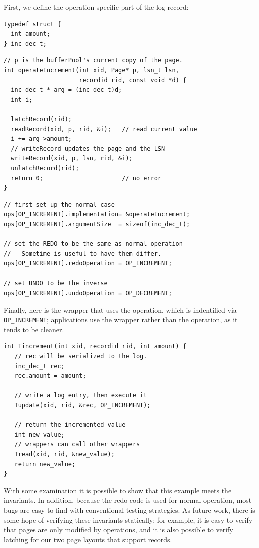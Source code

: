 \documentclass[letterpaper,twocolumn,english]{article}
\begin{document}
First, we define the operation-specific part of the log record:
\begin{small}
\begin{verbatim}
typedef struct {
  int amount;
} inc_dec_t;
\end{verbatim}
\begin{verbatim}
// p is the bufferPool's current copy of the page.
int operateIncrement(int xid, Page* p, lsn_t lsn,
                     recordid rid, const void *d) {
  inc_dec_t * arg = (inc_dec_t)d;
  int i;

  latchRecord(rid); 
  readRecord(xid, p, rid, &i);   // read current value
  i += arg->amount;
  // writeRecord updates the page and the LSN
  writeRecord(xid, p, lsn, rid, &i);
  unlatchRecord(rid); 
  return 0;                      // no error
}
\end{verbatim}
\begin{verbatim}
// first set up the normal case
ops[OP_INCREMENT].implementation= &operateIncrement;
ops[OP_INCREMENT].argumentSize  = sizeof(inc_dec_t);

// set the REDO to be the same as normal operation
//   Sometime is useful to have them differ.
ops[OP_INCREMENT].redoOperation = OP_INCREMENT;

// set UNDO to be the inverse
ops[OP_INCREMENT].undoOperation = OP_DECREMENT;
\end{verbatim}
{\normalsize Finally, here is the wrapper that uses the
operation, which is indentified via {\small\tt OP\_INCREMENT};
applications use the wrapper rather than the operation, as it tends to
be cleaner.}
\begin{verbatim}
int Tincrement(int xid, recordid rid, int amount) {
   // rec will be serialized to the log.
   inc_dec_t rec;
   rec.amount = amount;

   // write a log entry, then execute it
   Tupdate(xid, rid, &rec, OP_INCREMENT);

   // return the incremented value
   int new_value;
   // wrappers can call other wrappers
   Tread(xid, rid, &new_value);
   return new_value;
}
\end{verbatim}
\end{small}

With some examination it is possible to show that this example meets
the invariants.  In addition, because the redo code is used for normal
operation, most bugs are easy to find with conventional testing
strategies.  As future work, there is some hope of verifying these
invariants statically; for example, it is easy to verify that pages
are only modified by operations, and it is also possible to verify
latching for our two page layouts that support records.
\end{document}
